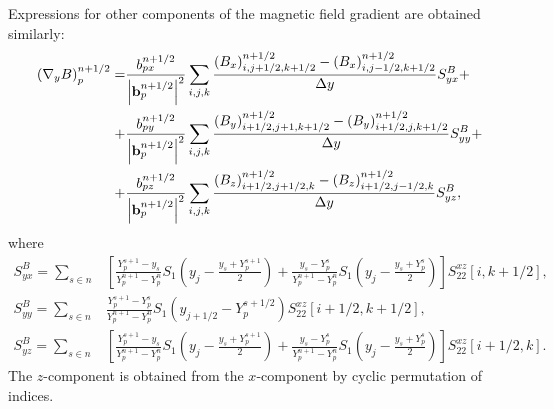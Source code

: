 \documentclass[final,3p]{elsarticle}
\begin{document}
Expressions for other components of the magnetic field gradient are obtained similarly:
\begin{align}
	\left(\nabla_y B\right)_p^{n+1/2}=&\frac{b_{px}^{n+1/2}}{\left|{\bf b}_p^{n+1/2}\right|^2}\sum\limits_{i,j,k} \frac{(B_x)_{i,j+1/2,k+1/2}^{n+1/2}-(B_x)_{i,j-1/2,k+1/2}^{n+1/2}}{\Delta y} S_{yx}^{B}+\nonumber \\
	+&\frac{b_{py}^{n+1/2}}{\left|{\bf b}_p^{n+1/2}\right|^2}\sum\limits_{i,j,k} \frac{(B_y)_{i+1/2,j+1,k+1/2}^{n+1/2}-(B_y)_{i+1/2,j,k+1/2}^{n+1/2}}{\Delta y} S_{yy}^B+\nonumber \\
	+&\frac{b_{pz}^{n+1/2}}{\left|{\bf b}_p^{n+1/2}\right|^2}\sum\limits_{i,j,k} \frac{(B_z)_{i+1/2,j+1/2,k}^{n+1/2}-(B_z)_{i+1/2,j-1/2,k}^{n+1/2}}{\Delta y} S_{yz}^B,
\end{align}
where 
\begin{align}
  S_{yx}^{B}=\sum\limits_{s\in n} &\left[\frac{Y_p^{s+1}-y_s}{Y_p^{n+1}-Y_p^n} S_1\left(y_{j}-\frac{y_s+Y_p^{s+1}}{2}\right)+\frac{y_s-Y_p^{s}}{Y_p^{n+1}-Y_p^n} S_1\left(y_{j}-\frac{y_s+Y_p^{s}}{2}\right)\right] S_{22}^{xz}[i,k+1/2], \\
	S_{yy}^{B}=\sum\limits_{s\in n} &\frac{Y_p^{s+1}-Y_p^s}{Y_p^{n+1}-Y_p^n} S_1\left(y_{j+1/2}-Y_p^{s+1/2}\right) S_{22}^{xz}[i+1/2,k+1/2], \\
	S_{yz}^{B}=\sum\limits_{s\in n} &\left[\frac{Y_p^{s+1}-y_s}{Y_p^{n+1}-Y_p^n} S_1\left(y_{j}-\frac{y_s+Y_p^{s+1}}{2}\right)+\frac{y_s-Y_p^{s}}{Y_p^{n+1}-Y_p^n} S_1\left(y_{j}-\frac{y_s+Y_p^{s}}{2}\right)\right] S_{22}^{xz}[i+1/2,k]. 
\end{align}
The $z$-component is obtained from the $x$-component by cyclic permutation of indices.
\end{document}
